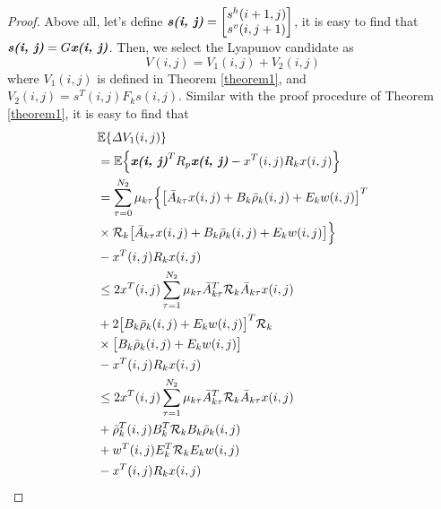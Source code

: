\documentclass[journal,final,twocolumn]{IEEEtran}
\begin{document}
\begin{proof} 
	Above all, let's define $\emph{\textbf{s(i, j)}} = \begin{bmatrix}
	s^{h}(i+1,j)\\ s^{v}(i,j+1)
	\end{bmatrix}$,  it is easy to find that $\emph{\textbf{s(i, j)}}=G\emph{\textbf{x(i, j)}}$.  Then, we select the Lyapunov candidate as
	\begin{equation}\label{LyapunoovT}
		V(i,j)=V_{1}(i,j)+V_{2}(i,j)
	\end{equation}
	where $V_{1}(i,j)$ is defined in Theorem \ref{theorem1}, and $V_{2}(i,j)=s^{T}(i,j)F_{k}s(i,j)$. Similar with the proof procedure of Theorem \ref{theorem1}, it is easy to find that
	\begin{equation} \label{P2T1}
		\begin{split}
				&\mathbb{E}\{\varDelta V_{1}(i,j) \}\\
			&=\mathbb{E}\Big\{\emph{\textbf{x(i, j)}}^{T}R_{p}\emph{\textbf{x(i, j)}} - x^{T}(i,j)R_{k}x(i,j)\Big\}\\
			&=  \sum_{\tau =0}^{N_{2}}\mu_{k\tau }\Big\{\big[\bar{A}_{k\tau }x(i,j)+B_{k}\bar{\rho}_{k}(i,j)+E_{k}w(i,j)\big]^{T}\\
			&\times\mathcal{R}_{k} \big[ \bar{A}_{k\tau }x(i,j)+B_{k}\bar{\rho}_{k}(i,j)+E_{k}w(i,j)\big]\Big\}\\
			&-x^{T}(i,j)R_{k}x(i,j)\\
			&\leq 2x^{T}(i,j)\sum_{\tau =1}^{N_{2}}\mu_{k\tau }\bar{A}^{T}_{k\tau }\mathcal{R}_{k}\bar{A}_{k\tau }x(i,j) \\
			&+2\big[B_{k}\bar{\rho}_{k}(i,j)+E_{k}w(i,j)\big]^{T}\mathcal{R}_{k}\\
			&\times\big[B_{k}\bar{\rho}_{k}(i,j)+E_{k}w(i,j)\big]\\
			&-x^{T}(i,j)R_{k}x(i,j)\\
			&\leq 2x^{T}(i,j)\sum_{\tau =1}^{N_{2}}\mu_{k\tau }\bar{A}^{T}_{k\tau }\mathcal{R}_{k}\bar{A}_{k\tau }x(i,j) \\
			&+ \bar{\rho}^{T}_{k}(i,j)B^{T}_{k}\mathcal{R}_{k}B_{k}\bar{\rho}_{k}(i,j)\\
			&+w^{T}(i,j)E^{T}_{k}\mathcal{R}_{k}E_{k}w(i,j)\\
			&-x^{T}(i,j)R_{k}x(i,j)

\end{split}
\end{equation}
\end{proof}
\end{document}
